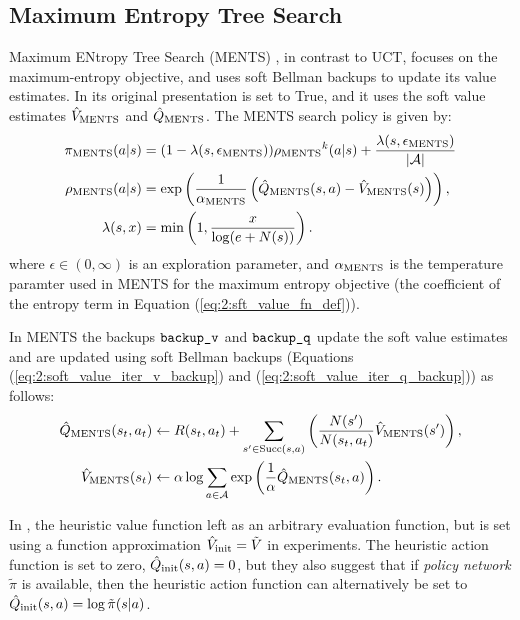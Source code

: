     \subsection{Maximum Entropy Tree Search}
    \label{sec:2-4-3-ments}

        Maximum ENtropy Tree Search (MENTS) \cite{ments}, in contrast to UCT, focuses on the maximum-entropy objective, and uses soft Bellman backups to update its value estimates. In its original presentation \mctsmode\ewe is set to True, and it uses the soft value estimates ${\hat{V}_{{\textnormal{MENTS}}}}$ and ${\hat{Q}_{{\textnormal{MENTS}}}}$. The MENTS search policy is given by:
        \begin{align}
            {\pi_{{\textnormal{MENTS}}}}(a|s) &= 
                (1-{\lambda(s,{\epsilon_{{\textnormal{MENTS}}}})}){\rho_{{\textnormal{MENTS}}}}^k(a|s) + \frac{{\lambda(s,{\epsilon_{{\textnormal{MENTS}}}})}}{|\mathcal{A}|} \label{eq:2:ments_policy} \\
            {\rho_{{\textnormal{MENTS}}}}(a|s) &= 
                \exp\left(\frac{1}{{\alpha_{{\textnormal{MENTS}}}}}\left({\hat{Q}_{{\textnormal{MENTS}}}}(s,a)-{\hat{V}_{{\textnormal{MENTS}}}}(s)\right)\right), \\
            \lambda(s,x) &= \min\left(1,\frac{x}{\log(e+N(s))}\right).
        \end{align}
        where $\epsilon \in (0,\infty)$ is an exploration parameter, and ${\alpha_{{\textnormal{MENTS}}}}$ is the temperature paramter used in MENTS for the maximum entropy objective (the coefficient of the entropy term in Equation (\ref{eq:2:sft_value_fn_def})).

        In MENTS the backups ${\textnormal{\texttt{backup\_v}}}$ and ${\textnormal{\texttt{backup\_q}}}$ update the soft value estimates and are updated using soft Bellman backups (Equations (\ref{eq:2:soft_value_iter_v_backup}) and (\ref{eq:2:soft_value_iter_q_backup})) as follows:
        \begin{align}
            {\hat{Q}_{{\textnormal{MENTS}}}}(s_t,a_t) &\leftarrow 
                R(s_t,a_t) + \sum_{s'\in{\textnormal{Succ}(s,a)}} \left( \frac{N(s')}{N(s_t,a_t)} {\hat{V}_{{\textnormal{MENTS}}}}(s') \right), \label{eq:2:ments_backup_q} \\
            {\hat{V}_{{\textnormal{MENTS}}}}(s_t) &\leftarrow 
                \alpha \log \sum_{a\in\mathcal{A}} \exp \left(\frac{1}{\alpha}{\hat{Q}_{{\textnormal{MENTS}}}}(s_t,a) \right). \label{eq:2:ments_backup_v} 
        \end{align}

        In \cite{ments}, the heuristic value function left as an arbitrary evaluation function, but is set using a function approximation ${\hat{V}_{\textnormal{init}}}=\tilde{V}$ in experiments. The heuristic action function is set to zero, ${\hat{Q}_{\textnormal{init}}}(s,a)=0$, but they also suggest that if \textit{policy network} $\tilde{\pi}$ is available, then the heuristic action function can alternatively be set to ${\hat{Q}_{\textnormal{init}}}(s,a)=\log \tilde{\pi}(s|a)$. 















